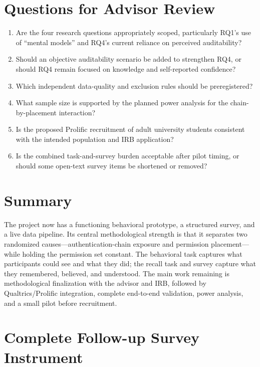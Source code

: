 \documentclass[11pt]{article}
\begin{document}
\section{Questions for Advisor Review}

\begin{enumerate}[leftmargin=1.6em]
  \item Are the four research questions appropriately scoped, particularly
        RQ1's use of ``mental models'' and RQ4's current reliance on perceived
        auditability?
  \item Should an objective auditability scenario be added to strengthen RQ4,
        or should RQ4 remain focused on knowledge and self-reported confidence?
  \item Which independent data-quality and exclusion rules should be
        preregistered?
  \item What sample size is supported by the planned power analysis for the
        chain-by-placement interaction?
  \item Is the proposed Prolific recruitment of adult university students
        consistent with the intended population and IRB application?
  \item Is the combined task-and-survey burden acceptable after pilot timing,
        or should some open-text survey items be shortened or removed?
\end{enumerate}

\section{Summary}

The project now has a functioning behavioral prototype, a structured survey,
and a live data pipeline. Its central methodological strength is that it
separates two randomized causes---authentication-chain exposure and permission
placement---while holding the permission set constant. The behavioral task
captures what participants could see and what they did; the recall task and
survey capture what they remembered, believed, and understood. The main work
remaining is methodological finalization with the advisor and IRB, followed by
Qualtrics/Prolific integration, complete end-to-end validation, power analysis,
and a small pilot before recruitment.

\appendix
\section{Complete Follow-up Survey Instrument}
\end{document}
